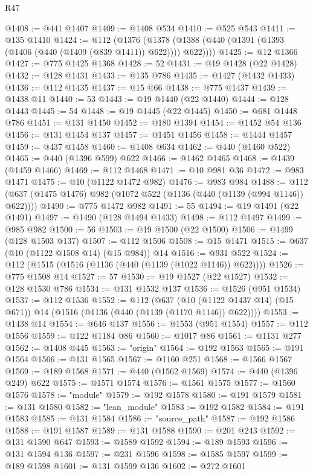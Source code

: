 \begin{lexlean}{R47}
\begin{coremodule}
@1408 := @441 @1407
@1409 := @1408 @534
@1410 := @525 @543
@1411 := @135 @1410
@1424 := @112
    (@1376 (@1378 (@1388 (@440 (@1391 (@1393 (@1406 (@440 (@1409 (@839 @1411)) @622)))) @622))))
@1425 := @12 @1366
@1427 := @775 @1425 @1368
@1428 := 52
@1431 := @19 @1428 (@22 @1428)
@1432 := @128 @1431
@1433 := @135 @786
@1435 := @1427 (@1432 @1433)
@1436 := @112 @1435
@1437 := @15 @66
@1438 := @775 @1437
@1439 := @1438 @11
@1440 := 53
@1443 := @19 @1440 (@22 @1440)
@1444 := @128 @1443
@1445 := 54
@1448 := @19 @1445 (@22 @1445)
@1450 := @681 @1448 @786
@1451 := @131 @1450
@1452 := @180 @1394
@1454 := @1452 @54 @136
@1456 := @131 @1454 @137
@1457 := @1451 @1456
@1458 := @1444 @1457
@1459 := @437 @1458
@1460 := @1408 @634
@1462 := @440 (@1460 @522)
@1465 := @440 (@1396 @599) @622
@1466 := @1462 @1465
@1468 := @1439 (@1459 @1466)
@1469 := @112 @1468
@1471 := @10 @981 @36
@1472 := @983 @1471
@1475 := @10 (@1122 @1472 @982)
@1476 := @983 @984
@1488 := @112 (@637 (@1475 @1476) @982 (@1072 @522 (@1136 (@440 (@1139 (@994 @1146)) @622))))
@1490 := @775 @1472 @982
@1491 := 55
@1494 := @19 @1491 (@22 @1491)
@1497 := @1490 (@128 @1494 @1433)
@1498 := @112 @1497
@1499 := @985 @982
@1500 := 56
@1503 := @19 @1500 (@22 @1500)
@1506 := @1499 (@128 @1503 @137)
@1507 := @112 @1506
@1508 := @15 @1471
@1515 := @637 (@10 (@1122 @1508 @14) (@15 @984)) @14
@1516 := @931 @522
@1524 := @112 (@1515 (@1516 (@1136 (@440 (@1139 (@1022 @1146)) @622))))
@1526 := @775 @1508 @14
@1527 := 57
@1530 := @19 @1527 (@22 @1527)
@1532 := @128 @1530 @786
@1534 := @131 @1532 @137
@1536 := @1526 (@951 @1534)
@1537 := @112 @1536
@1552 := @112
    (@637 (@10 (@1122 @1437 @14) (@15 @671)) @14 (@1516 (@1136 (@440 (@1139 (@1170 @1146)) @622))))
@1553 := @1438 @14
@1554 := @646 @137
@1556 := @1553 (@951 @1554)
@1557 := @112 @1556
@1559 := @122 @1184 @86
@1560 := @1017 @86
@1561 := @1131 @277
@1562 := @1408 @445
@1563 := "origin"
@1564 := @192 @1563
@1565 := @191 @1564
@1566 := @131 @1565
@1567 := @1160 @251
@1568 := @1566 @1567
@1569 := @189 @1568
@1571 := @440 (@1562 @1569)
@1574 := @440 (@1396 @249) @622
@1575 := @1571 @1574
@1576 := @1561 @1575
@1577 := @1560 @1576
@1578 := "module"
@1579 := @192 @1578
@1580 := @191 @1579
@1581 := @131 @1580
@1582 := "lean_module"
@1583 := @192 @1582
@1584 := @191 @1583
@1585 := @131 @1584
@1586 := "source_path"
@1587 := @192 @1586
@1588 := @191 @1587
@1589 := @131 @1588
@1590 := @201 @243
@1592 := @131 @1590 @647
@1593 := @1589 @1592
@1594 := @189 @1593
@1596 := @131 @1594 @136
@1597 := @231 @1596
@1598 := @1585 @1597
@1599 := @189 @1598
@1601 := @131 @1599 @136
@1602 := @272 @1601

\end{coremodule}
\end{lexlean}
